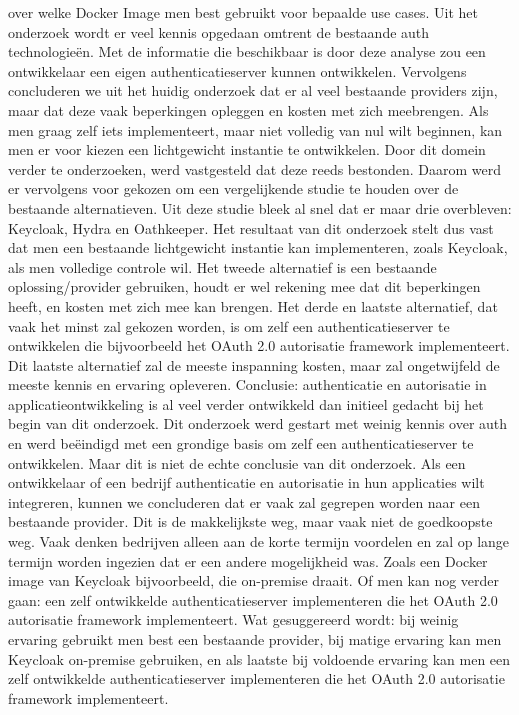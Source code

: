 over welke Docker Image men best gebruikt voor bepaalde use cases.
\newline
\newline
Uit het onderzoek wordt er veel kennis opgedaan omtrent de bestaande auth technologieën. Met de informatie die beschikbaar is door deze analyse
zou een ontwikkelaar een eigen authenticatieserver kunnen ontwikkelen. Vervolgens concluderen we uit het huidig onderzoek dat er al veel bestaande 
providers zijn, maar dat deze vaak beperkingen opleggen en kosten met zich meebrengen. Als men graag zelf iets implementeert, maar niet volledig
van nul wilt beginnen, kan men er voor kiezen een lichtgewicht instantie te ontwikkelen. Door dit domein verder te onderzoeken, werd vastgesteld 
dat deze reeds bestonden. Daarom werd er vervolgens voor gekozen om een vergelijkende studie te houden over de bestaande alternatieven. Uit deze
studie bleek al snel dat er maar drie overbleven: Keycloak, Hydra en Oathkeeper. Het resultaat van dit onderzoek stelt dus vast dat men een bestaande
lichtgewicht instantie kan implementeren, zoals Keycloak, als men volledige controle wil. Het tweede alternatief is een bestaande oplossing/provider
gebruiken, houdt er wel rekening mee dat dit beperkingen heeft, en kosten met zich mee kan brengen. Het derde en laatste alternatief, dat vaak het minst zal
gekozen worden, is om zelf een authenticatieserver te ontwikkelen die bijvoorbeeld het OAuth 2.0 autorisatie framework implementeert. Dit laatste alternatief
zal de meeste inspanning kosten, maar zal ongetwijfeld de meeste kennis en ervaring opleveren.
\newline
\newline
Conclusie: authenticatie en autorisatie in applicatieontwikkeling is al veel verder ontwikkeld dan initieel gedacht bij het begin van dit onderzoek.
Dit onderzoek werd gestart met weinig kennis over auth en werd beëindigd met een grondige basis om zelf een authenticatieserver te ontwikkelen.
Maar dit is niet de echte conclusie van dit onderzoek. Als een ontwikkelaar of een bedrijf authenticatie en autorisatie in hun applicaties wilt
integreren, kunnen we concluderen dat er vaak zal gegrepen worden naar een bestaande provider. Dit is de makkelijkste weg, maar vaak niet de
goedkoopste weg. Vaak denken bedrijven alleen aan de korte termijn voordelen en zal op lange termijn worden ingezien dat er een andere
mogelijkheid was. Zoals een Docker image van Keycloak bijvoorbeeld, die on-premise draait. Of men kan nog verder gaan: een zelf ontwikkelde
authenticatieserver implementeren die het OAuth 2.0 autorisatie framework implementeert. Wat gesuggereerd wordt: bij weinig ervaring gebruikt men
best een bestaande provider, bij matige ervaring kan men Keycloak on-premise gebruiken, en als laatste bij voldoende ervaring kan men een zelf
ontwikkelde authenticatieserver implementeren die het OAuth 2.0 autorisatie framework implementeert.
